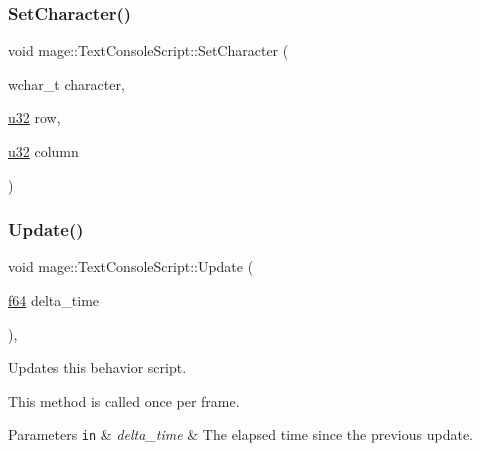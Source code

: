 \hypertarget{classmage_1_1_text_console_script_a5a968a3966cf030685ca9c04df4b8c04}{}\label{classmage_1_1_text_console_script_a5a968a3966cf030685ca9c04df4b8c04} 
\subsubsection{\texorpdfstring{Set\+Character()}{SetCharacter()}}
{\footnotesize\ttfamily void mage\+::\+Text\+Console\+Script\+::\+Set\+Character (\begin{DoxyParamCaption}\item[{wchar\+\_\+t}]{character,  }\item[{\hyperlink{namespacemage_af2b398bf98eb10351f49cad73fe2cc73}{u32}}]{row,  }\item[{\hyperlink{namespacemage_af2b398bf98eb10351f49cad73fe2cc73}{u32}}]{column }\end{DoxyParamCaption})\hspace{0.3cm}{\ttfamily [private]}}

\hypertarget{classmage_1_1_text_console_script_ae26b3b5bd9ca755295d50d594d549abb}{}\label{classmage_1_1_text_console_script_ae26b3b5bd9ca755295d50d594d549abb} 
\subsubsection{\texorpdfstring{Update()}{Update()}}
{\footnotesize\ttfamily void mage\+::\+Text\+Console\+Script\+::\+Update (\begin{DoxyParamCaption}\item[{\hyperlink{namespacemage_ab935747c6941320bd6214b5a5f265b09}{f64}}]{delta\+\_\+time }\end{DoxyParamCaption})\hspace{0.3cm}{\ttfamily [override]}, {\ttfamily [virtual]}}

Updates this behavior script.

This method is called once per frame.


\begin{DoxyParams}[1]{Parameters}
\mbox{\tt in}  & {\em delta\+\_\+time} & The elapsed time since the previous update. \\
\hline
\end{DoxyParams}



